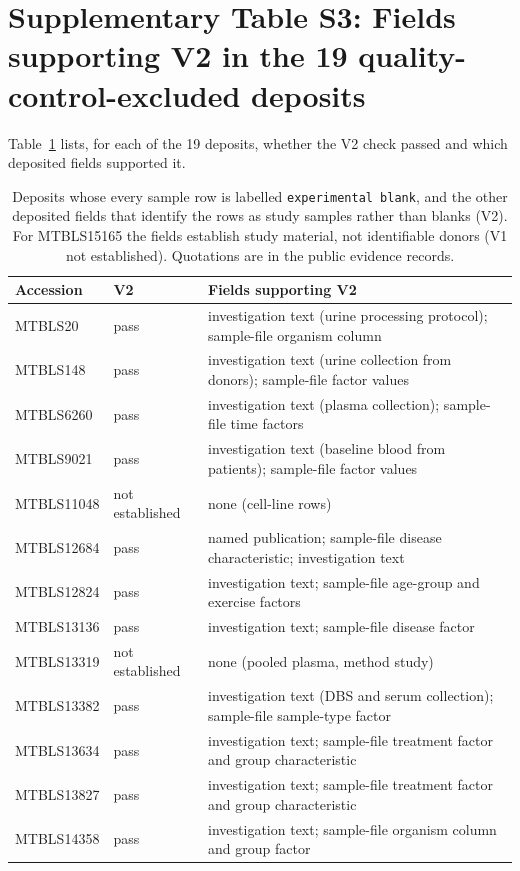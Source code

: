 \documentclass[sn-basic]{sn-jnl}
\begin{document}
\section*{Supplementary Table S3: Fields supporting V2 in the 19 quality-control-excluded deposits}
Table~\ref{tab:S3} lists, for each of the 19 deposits, whether the V2 check passed and which deposited fields supported it.
\begin{table}[!ht]
\caption{Deposits whose every sample row is labelled \texttt{experimental blank}, and the other deposited fields that identify the rows as study samples rather than blanks (V2). For MTBLS15165 the fields establish study material, not identifiable donors (V1 not established). Quotations are in the public evidence records.}\label{tab:S3}
\begin{tabular*}{\textwidth}{@{\extracolsep\fill}llp{}}
\toprule
Accession & V2 & Fields supporting V2 \\
\midrule
MTBLS20 & pass & investigation text (urine processing protocol); sample-file organism column \\
MTBLS148 & pass & investigation text (urine collection from donors); sample-file factor values \\
MTBLS6260 & pass & investigation text (plasma collection); sample-file time factors \\
MTBLS9021 & pass & investigation text (baseline blood from patients); sample-file factor values \\
MTBLS11048 & not established & none (cell-line rows) \\
MTBLS12684 & pass & named publication; sample-file disease characteristic; investigation text \\
MTBLS12824 & pass & investigation text; sample-file age-group and exercise factors \\
MTBLS13136 & pass & investigation text; sample-file disease factor \\
MTBLS13319 & not established & none (pooled plasma, method study) \\
MTBLS13382 & pass & investigation text (DBS and serum collection); sample-file sample-type factor \\
MTBLS13634 & pass & investigation text; sample-file treatment factor and group characteristic \\
MTBLS13827 & pass & investigation text; sample-file treatment factor and group characteristic \\
MTBLS14358 & pass & investigation text; sample-file organism column and group factor \\

\end{tabular*}
\end{table}
\end{document}
